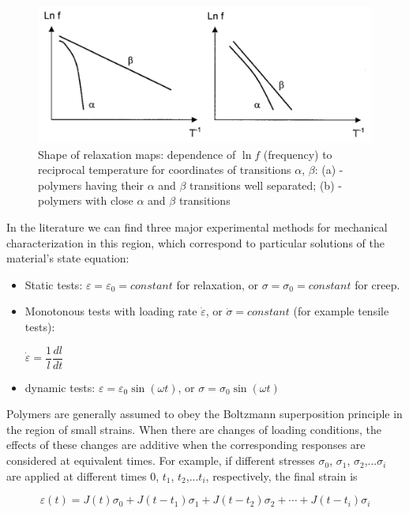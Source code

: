 \begin{itemize}
	\begin{figure}
		\centering
		\includegraphics[width=0.8\linewidth]{obrazky/effect_on_cross_link_density}
		\caption[Shape of relaxation maps]{Shape of relaxation maps: dependence of $\ln f$ (frequency) to reciprocal temperature for coordinates of transitions $\alpha$, $\beta$: (a) - polymers having their $\alpha$ and $\beta$ transitions well separated; (b) - polymers with close $\alpha$ and $\beta$ transitions}
		\label{fig:effectoncrosslinkdensity}
	\end{figure}
	
	In the literature we can find three major experimental methods for mechanical characterization in this region, which correspond to particular solutions of the material's state equation: 
	
	\begin{itemize}
		\item Static tests: $\varepsilon = \varepsilon_{0} = constant$ for relaxation, or $\sigma = \sigma_{0} = constant$ for creep. 
		
		\item Monotonous tests with loading rate $\dot{\varepsilon}$, or $\dot{\sigma} = constant$ (for example tensile tests): 
		
		$\dot{\varepsilon} = \dfrac{1}{l}\dfrac{dl}{dt}$
		
		\item dynamic tests: $\varepsilon = \varepsilon_{0} \sin(\omega t)$, or $\sigma = \sigma_{0} \sin(\omega t)$
	\end{itemize}
	
	Polymers are generally assumed to obey the Boltzmann superposition principle in the region of small strains. When there are changes of loading conditions, the effects of these changes are additive when the corresponding responses are considered at equivalent times. For example, if different stresses $\sigma_{0}$, $\sigma_{1}$, $\sigma_{2}$,...$\sigma_{i}$ are applied at different times $0$, $t_{1}$, $t_{2}$,...$t_{i}$, respectively, the final strain is
	
	\begin{equation}\label{eq2:boltzmann_eps}
		\varepsilon(t) = J(t)\sigma_{0} + J(t-t_{1})\sigma_{1}+J(t-t_{2})\sigma_{2}+\cdots+J(t-t_{i})\sigma_{i}
	\end{equation}
	

\end{itemize}
